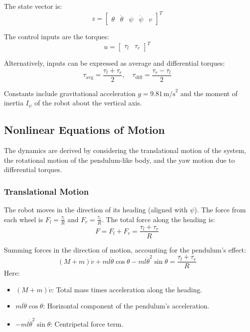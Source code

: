 \documentclass{article}
\begin{document}
The state vector is:
\begin{equation}
    z = \begin{bmatrix} \theta & \dot{\theta} & \psi & \dot{\psi} & v \end{bmatrix}^T
\end{equation}

The control inputs are the torques:
\begin{equation}
    u = \begin{bmatrix} \tau_l & \tau_r \end{bmatrix}^T
\end{equation}

Alternatively, inputs can be expressed as average and differential torques:
\begin{equation}
    \tau_{\text{avg}} = \frac{\tau_l + \tau_r}{2}, \quad \tau_{\text{diff}} = \frac{\tau_r - \tau_l}{2}
\end{equation}

Constants include gravitational acceleration \( g = 9.81 \, \text{m/s}^2 \) and the moment of inertia \( I_\psi \) of the robot about the vertical axis.

\subsection{Nonlinear Equations of Motion}

The dynamics are derived by considering the translational motion of the system, the rotational motion of the pendulum-like body, and the yaw motion due to differential torques.

\subsubsection{Translational Motion}

The robot moves in the direction of its heading (aligned with \( \psi \)). The force from each wheel is \( F_l = \frac{\tau_l}{R} \) and \( F_r = \frac{\tau_r}{R} \). The total force along the heading is:
\begin{equation}
    F = F_l + F_r = \frac{\tau_l + \tau_r}{R}
\end{equation}

Summing forces in the direction of motion, accounting for the pendulum's effect:
\begin{equation}
    (M + m) \dot{v} + m l \ddot{\theta} \cos \theta - m l \dot{\theta}^2 \sin \theta = \frac{\tau_l + \tau_r}{R}
\end{equation}
Here:
\begin{itemize}
    \item \( (M + m) \dot{v} \): Total mass times acceleration along the heading.
    \item \( m l \ddot{\theta} \cos \theta \): Horizontal component of the pendulum's acceleration.
    \item \( - m l \dot{\theta}^2 \sin \theta \): Centripetal force term.
\end{itemize}
\end{document}
